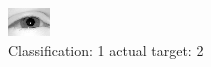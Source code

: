 \begin{figure}[h!]
\begin{center}
\includegraphics[width=0.60\columnwidth]{figures/ID2258_class_1_target_2.png}
\end{center}
\caption{ Classification: 1 actual target: 2}
\label{fig:ID2258_class_1_target_2}
\end{figure}
